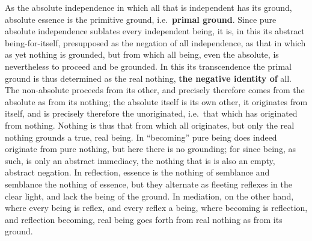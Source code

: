 \documentclass[12pt,a4paper,openany]{book}
\newcommand{\opage}[1]{\marginnote{\footnotesize\textit{[#1]}}}
\begin{document}
As the absolute independence in which all that is independent
has its ground, absolute essence is the
primitive ground, i.e.\ \textbf{primal ground}. Since pure absolute
independence sublates every independent being,
it is, in this its abstract being-for-itself, presupposed as
the negation of all independence, as that in which
as yet nothing is grounded, but from which all being, even
the absolute, is nevertheless to proceed and be grounded. In this
its transcendence the primal ground is thus determined as the
real nothing, \textbf{the negative identity of} all. The
non-absolute proceeds from its other, and precisely
therefore comes from the absolute as from its nothing; the absolute
itself is its own other, it originates from itself, and is
\setcounter{footnote}{0}%
\opage{128}precisely therefore the unoriginated, i.e.\ that which has originated from nothing.
Nothing is thus that from which all originates, but only the
real nothing grounds a true, real being. In ``becoming''
pure being does indeed originate from pure nothing,
but here there is no grounding; for since being, as such,
is only an abstract immediacy, the nothing that is
is also an empty, abstract negation. In reflection,
essence is the nothing of semblance and semblance the nothing of essence,
but they alternate as fleeting reflexes in the clear light, and
lack the being of the ground. In mediation, on the other hand,
where every being is reflex, and every reflex a being,
where becoming is reflection, and reflection becoming,
real being goes forth from real nothing as from
its ground.
\end{document}
